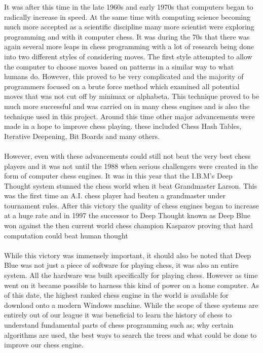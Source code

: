 \documentclass{l3proj}
\begin{document}
	It was after this time in the late 1960s and early 1970s that computers began to radically increase in speed. At the same time with computing science becoming much more accepted as a scientific discipline many more scientist were exploring programming and with it computer chess. \cite{MuseumMiddle} It was during the 70s that there was again several more leaps in chess programming with a lot of research being done into two different styles of considering moves. The first style attempted to allow the computer to choose moves based on patterns in a similar way to what humans do. However, this proved to be very complicated and the majority of programmers focused on a brute force method which examined all potential moves that was not cut off by minimax or alphabeta. This technique proved to be much more successful and was carried on in many chess engines and is also the technique used in this project. Around this time other major advancements were made in a hope to improve chess playing. these included Chess Hash Tables, Iterative Deepening, Bit Boards and many others. \cite{MuseumSearch} \\\\
	However, even with these advancements could still not beat the very best chess players and it was not until the 1988 when serious challengers were created in the form of computer chess engines. It was in this year that the I.B.M's Deep Thought system stunned the chess world when it beat Grandmaster Larson. This was the first time an A.I. chess player had beaten a grandmaster under tournament rules.\cite{NewYork} After this victory the quality of chess engines began to increase at a huge rate and in 1997 the successor to Deep Thought known as Deep Blue won against the then current world chess champion Kasparov proving that hard computation could beat human thought \cite{DeepBlue} \\\\
	While this victory was immensely important, it should also be noted that Deep Blue was not just a piece of software for playing chess, it was also an entire system. All the hardware was built specifically for playing chess. However as time went on it became possible to harness this kind of power on a home computer. As of this date, the highest ranked chess engine in the world is available for download onto a modern Windows machine. \cite{Houdini} While the scope of these systems are entirely out of our league it was beneficial to learn the history of chess to understand fundamental parts of chess programming such as; why certain algorithms are used, the best ways to search the trees and what could be done to improve our chess engine. \\\\
\end{document}

